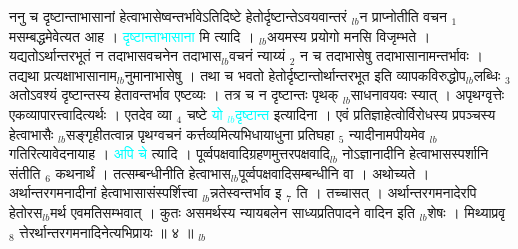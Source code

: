 \documentclass[article,12pt,a4paper]{memoir}%
\newcommand{\quotelemma}[1]{\textcolor{cyan}{#1}}
\newcounter{parCount}
\begin{document}
	  
	  \pstart \leavevmode%
	ननु च दृष्टान्ताभासानां हेत्वाभासेष्वन्तर्भावेऽतिदिष्टे हेतोर्दृष्टान्तेऽवयवान्तरं {\tiny $_{lb}$}न प्राप्नोतीति वचन {\tiny $_{1}$} मसम्बद्धमेवेत्यत आह । \quotelemma{दृष्टान्ताभासाना} मि \cite[12a9]{vn-msN} त्यादि । {\tiny $_{lb}$}अयमस्य प्रयोगो मनसि विजृम्भते । यद्यतोऽर्थान्तरभूतं न तदाभासवचनेन तदाभास{\tiny $_{lb}$}वचनं न्याय्यं {\tiny $_{2}$} न च तदाभासेषु तदाभासानामन्तर्भावः । तद्यथा प्रत्यक्षाभासानाम{\tiny $_{lb}$}नुमानाभासेषु । तथा च भवतो हेतोर्दृष्टान्तोर्थान्तरभूत इति व्यापकविरुद्धोप{\tiny $_{lb}$}लब्धिः {\tiny $_{3}$} अतोऽवश्यं दृष्टान्तस्य हेतावन्तर्भाव एष्टव्यः । तत्र च न दृष्टान्तः पृथक् {\tiny $_{lb}$}साधनावयवः स्यात् । अपृथग्वृत्तेः एकव्यापारत्त्वादित्यर्थः । एतदेव व्या {\tiny $_{4}$} चष्टे \quotelemma{यो {\tiny $_{lb}$}दृष्टान्त} \cite[12b1]{vn-msN} इत्यादिना । एवं प्रतिज्ञाहेत्वोर्विरोधस्य प्रपञ्चस्य हेत्वाभासैः {\tiny $_{lb}$}सङ्गृहीतत्वान्न पृथग्वचनं कर्त्तव्यमित्यभिधायाधुना प्रतिघहा {\tiny $_{5}$} न्यादीनामपीयमेव {\tiny $_{lb}$}गतिरित्यावेदनायाह । \quotelemma{अपि चे} \cite[12b1]{vn-msN} त्यादि । पूर्व्वपक्षवादिग्रहणमुत्तरपक्षवादि{\tiny $_{lb}$}\leavevmode{} नोऽज्ञानादीनि हेत्वाभासस्पर्शानि संतीति {\tiny $_{6}$} कथनार्थं । तत्सम्बन्धीनीति हेत्वाभास{\tiny $_{lb}$}पूर्व्वपक्षवादिसम्बन्धीनि वा । अथोच्यते । अर्थान्तरगमनादीनां हेत्वाभासासंस्पर्शित्त्वा {\tiny $_{lb}$}न्नतेस्वन्तर्भाव इ {\tiny $_{7}$} ति । तच्चासत् । अर्थान्तरगमनादेरपि हेतोरस{\tiny $_{lb}$}मर्थ एवमतिसम्भवात् । कुतः असमर्थस्य न्यायबलेन साध्यप्रतिपादने वादिन इति {\tiny $_{lb}$}शेषः । मिथ्याप्रवृ {\tiny $_{8}$} त्तेरर्थान्तरगमनादिनेत्यभिप्रायः ॥ ४ ॥
	{}
	\pend%
      {\tiny $_{lb}$}
\end{document}
